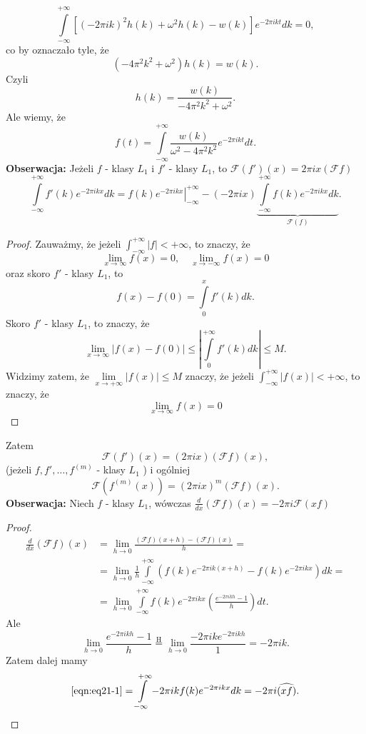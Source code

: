 \documentclass[../main.tex]{subfiles}
\begin{document}
\[
    \int\limits_{-\infty}^{+\infty}\left[(-2\pi i k)^2 h(k) + \omega^2 h(k) - w(k)\right]e^{-2\pi i k t}dk = 0
,\]
co by oznaczało tyle, że
\[
    \left(-4 \pi^2 k^2 + \omega^2\right)h(k) = w(k)
.\]
Czyli
\[
    h(k) = \frac{w(k)}{-4\pi^2 k^2 + \omega^2}
.\]
Ale wiemy, że
\[
    f(t) = \int\limits_{-\infty}^{+\infty}\frac{w(k)}{\omega^2 - 4 \pi^2 k^2}e^{-2\pi i kt}dt
.\]
\textbf{Obserwacja: }Jeżeli $f$ - klasy $L_1$ i $f'$ - klasy $L_1$, to $\mathcal{F}\left(f'\right)(x) = 2\pi i x (\mathcal{F}f)$
\[
    \int\limits_{-\infty}^{+\infty}f'(k)e^{-2\pi i kx}dk = \left. f(k)e^{-2 \pi i kx} \right|_{-\infty}^{+\infty} - \left( -2\pi i x \right) \underbrace{\int\limits_{-\infty}^{+\infty}f(k)e^{-2\pi i kx}dk}_{\mathcal{F}(f)}
.\]
\begin{proof}

Zauważmy, że jeżeli $\int_{-\infty}^{+\infty}|f| < +\infty$, to znaczy, że
\[
    \lim_{x \to \infty}f(x) = 0,\quad \lim_{x \to -\infty}f(x) = 0
\]
oraz skoro $f'$ - klasy $L_1$, to
\[
    f(x) - f(0) = \int\limits_{0}^x f'(k)dk
.\]
Skoro $f'$ - klasy $L_1$, to znaczy, że
\[
    \lim_{x \to \infty}\left| f(x) - f(0) \right| \le \left| \int\limits_{0}^{+\infty}f'(k)dk \right| \le M
.\]
Widzimy zatem, że $\lim\limits_{x \to +\infty}\left| f(x) \right| \le M$ znaczy, że jeżeli $\int_{-\infty}^{+\infty}|f(x)| < +\infty$, to znaczy, że
\[\lim_{x \to \infty}f(x) = 0\]
\end{proof}
Zatem
\[
    \mathcal{F}\left( f' \right) (x) = (2\pi i x)(\mathcal{F}f)(x)
,\]
(jeżeli $f,f',\ldots,f^{(m)}$ - klasy $L_1$ ) i ogólniej
\[
    \mathcal{F}(f^{(m)}(x)) = \left( 2\pi i x \right) ^m (\mathcal{F}f)(x)
.\]
\textbf{Obserwacja: }Niech $f$ - klasy $L_1$, wówczas $\frac{d}{dx} \left( \mathcal{F}f \right) (x) = -2\pi i \mathcal{F}(xf)$
\begin{proof}
    \begin{align*}
        \frac{d}{dx}\left( \mathcal{F}f \right) (x) &= \lim_{h \to 0}\frac{(\mathcal{F}f)(x+h) - (\mathcal{F}f)(x)}{h} =\\
        &= \lim_{h \to 0}\frac{1}{h}\int\limits_{-\infty}^{+\infty}\left( f(k)e^{-2\pi i k(x+h)} - f(k)e^{-2\pi i kx} \right)dk =\\
        \label{eqn:eq21-1}
        &= \lim_{h \to 0}\int\limits_{-\infty}^{+\infty}f(k)e^{-2\pi i k x}\left( \frac{e^{-2\pi i k h} - 1}{h} \right) dt\tag{$\star$}
    .\end{align*}
Ale
\[
    \lim_{h \to 0}\frac{e^{-2\pi i k h} - 1}{h} \overset{\text{H}}{=} \lim_{h \to 0} \frac{-2\pi i ke^{-2\pi i kh}}{1} = -2\pi i k
.\]
Zatem dalej mamy
\[
    \eqref{eqn:eq21-1} = \int\limits_{-\infty}^{+\infty}-2\pi i k f(k)e^{-2\pi i kx}dk = -2\pi i \widehat{\left( xf \right) }
.\]
\end{proof}
\end{document}

